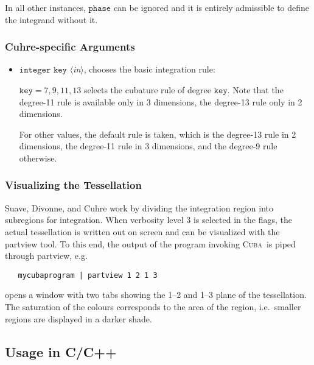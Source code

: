 \documentclass[12pt]{article}
\newcommand\cuba{\textsc{Cuba}}
\newcommand\ie{i.e.\ }
\newcommand\eg{e.g.\ }
\newcommand\Code[1]{\ensuremath{\texttt{#1}}}
\newcommand\VarIn[1]{\item\Code{#1} \textit{$\langle$in\/$\rangle$},}
\begin{document}
In all other instances, \Code{phase} can be ignored and it is
entirely admissible to define the integrand without it.


\subsubsection{Cuhre-specific Arguments}

\begin{itemize}
\VarIn{integer key}
chooses the basic integration rule:

$\Code{key} = 7, 9, 11, 13$ selects the cubature rule of degree 
\Code{key}.  Note that the degree-11 rule is available only in 3
dimensions, the degree-13 rule only in 2 dimensions.

For other values, the default rule is taken, which is the degree-13 rule 
in 2 dimensions, the degree-11 rule in 3 dimensions, and the degree-9 
rule otherwise.
\end{itemize}


\subsubsection{Visualizing the Tessellation}

Suave, Divonne, and Cuhre work by dividing the integration region into 
subregions for integration.  When verbosity level 3 is selected in the 
flags, the actual tessellation is written out on screen and can be 
visualized with the partview tool.  To this end, the output of the 
program invoking \cuba\ is piped through partview, \eg
\begin{verbatim}
   mycubaprogram | partview 1 2 1 3
\end{verbatim}
opens a window with two tabs showing the 1--2 and 1--3 plane of the 
tessellation.  The saturation of the colours corresponds to the area of
the region, \ie smaller regions are displayed in a darker shade.


\subsection{Usage in C/C++}
\end{document}
